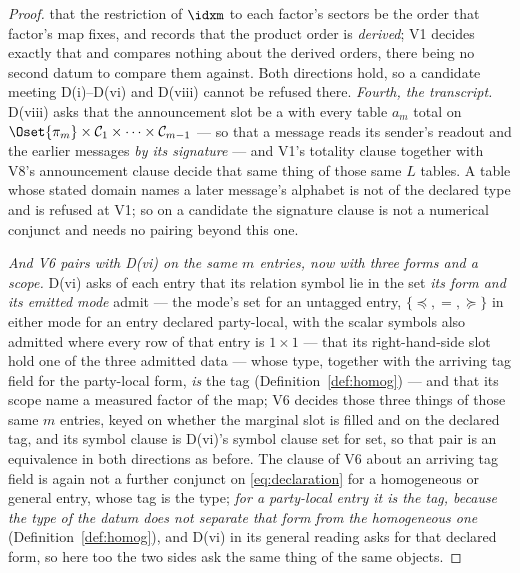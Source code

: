 \begin{proof}
that the restriction of $\idxm$ to each factor's sectors be the order that
factor's map fixes, and records that the product order is \emph{derived}; V1
decides exactly that and compares nothing about the derived orders, there
being no second datum to compare them against. Both directions hold, so a
candidate meeting D(i)--D(vi) and D(viii) cannot be refused there.
\emph{Fourth, the transcript.} D(viii) asks that the announcement slot be a
 with every table $a_m$ total on
$\Oset{\pi_m}\times\mathcal{C}_1\times\dots\times\mathcal{C}_{m-1}$ --- so that
a message reads its sender's readout and the earlier messages \emph{by its
signature} --- and V1's totality clause together with V8's announcement clause
decide that same thing of those same $L$ tables. A table whose stated domain
names a later message's alphabet is not of the declared type and is refused at
V1; so on a candidate the signature clause is not a numerical conjunct and
needs no pairing beyond this one.

\emph{And V6 pairs with D(vi) on the same $m$ entries, now with three forms and
a scope.} D(vi) asks of each entry that its relation symbol lie in the set
\emph{its form and its emitted mode} admit --- the mode's set for an untagged
entry, $\{\preceq,=,\succeq\}$ in either mode for an entry declared
party-local, with the scalar symbols also admitted where every row of that
entry is $1\times1$ --- that its right-hand-side slot hold one of the three
admitted data --- whose type, together with the arriving tag field for the
party-local form, \emph{is} the tag (Definition~\ref{def:homog}) --- and that
its scope name a measured factor of the map; V6 decides those three things of
those same $m$ entries, keyed on whether the marginal slot is filled and on
the declared tag, and its symbol clause is D(vi)'s symbol clause set for set,
so that pair is an equivalence in both directions as before. The clause of V6
about an arriving tag field is again not a further conjunct on
\eqref{eq:declaration} for a homogeneous or general entry, whose tag is the
type; \emph{for a party-local entry it is the tag, because the type of the
datum does not separate that form from the homogeneous one}
(Definition~\ref{def:homog}), and D(vi) in its general reading asks for that
declared form, so here too the two sides ask the same thing of the same
objects.


\end{proof}
